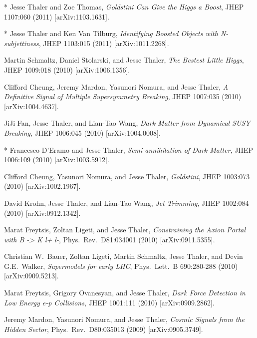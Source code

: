 \begin{list}{[]\addtocounter{jessecount}{-1}}{\leftmargin=3em \itemsep=4pt}
\item
* Jesse Thaler and Zoe Thomas,
\emph{Goldstini Can Give the Higgs a Boost},
JHEP 1107:060 (2011)
[arXiv:1103.1631].

\item
* Jesse Thaler and Ken Van Tilburg,
\emph{Identifying Boosted Objects with N-subjettiness},
JHEP 1103:015 (2011)
[arXiv:1011.2268].

\item
 Martin Schmaltz, Daniel Stolarski, and Jesse Thaler,
\emph{The Bestest Little Higgs},
JHEP 1009:018 (2010)
[arXiv:1006.1356].

\item
 Clifford Cheung, Jeremy Mardon, Yasunori Nomura, and Jesse Thaler,
\emph{A Definitive Signal of Multiple Supersymmetry Breaking},
JHEP 1007:035 (2010)
[arXiv:1004.4637].

\item
 JiJi Fan, Jesse Thaler, and Lian-Tao Wang,
\emph{Dark Matter from Dynamical SUSY Breaking},
JHEP 1006:045 (2010)
[arXiv:1004.0008].

\item
* Francesco D'Eramo and Jesse Thaler,
\emph{Semi-annihilation of Dark Matter},
JHEP 1006:109 (2010)
[arXiv:1003.5912].

\item
 Clifford Cheung, Yasunori Nomura, and Jesse Thaler,
\emph{Goldstini},
JHEP 1003:073 (2010)
[arXiv:1002.1967].

\item
 David Krohn, Jesse Thaler, and Lian-Tao Wang,
\emph{Jet Trimming},
JHEP 1002:084 (2010)
[arXiv:0912.1342].

\item
 Marat Freytsis, Zoltan Ligeti, and Jesse Thaler,
\emph{Constraining the Axion Portal with B -> K l+ l-},
Phys.\ Rev.\ D81:034001 (2010)
[arXiv:0911.5355].

\item
 Christian W.\ Bauer, Zoltan Ligeti, Martin Schmaltz, Jesse Thaler, and Devin G.E.\ Walker,
\emph{Supermodels for early LHC},
Phys.\ Lett.\ B 690:280-288 (2010)
[arXiv:0909.5213].

\item
 Marat Freytsis, Grigory Ovanesyan, and Jesse Thaler,
\emph{Dark Force Detection in Low Energy e-p Collisions},
JHEP 1001:111 (2010)
[arXiv:0909.2862].

\item
 Jeremy Mardon, Yasunori Nomura, and Jesse Thaler,
\emph{Cosmic Signals from the Hidden Sector},
Phys.\ Rev.\ D80:035013 (2009)
[arXiv:0905.3749].


\end{list}
